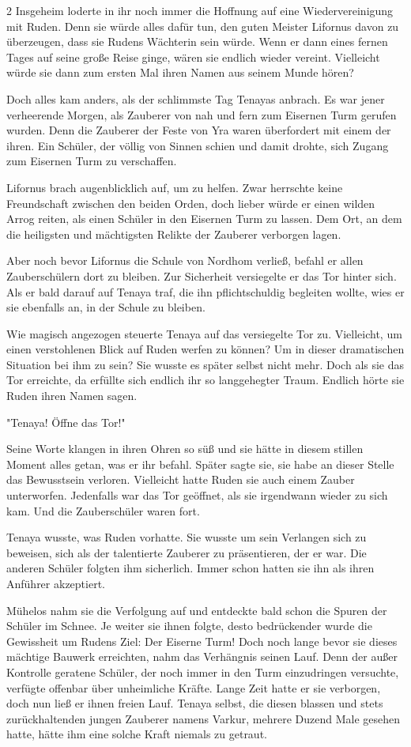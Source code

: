 \documentclass[10pt, a4paper, oneside]{book}
\begin{document}
\begin{multicols}{2}
Insgeheim loderte in ihr noch immer die Hoffnung auf eine Wiedervereinigung mit Ruden. Denn sie würde alles dafür tun, den guten Meister Lifornus davon zu überzeugen, dass sie Rudens Wächterin sein würde. Wenn er dann eines fernen Tages auf seine große Reise ginge, wären sie endlich wieder vereint. Vielleicht würde sie dann zum ersten Mal ihren Namen aus seinem Munde hören?

Doch alles kam anders, als der schlimmste Tag Tenayas anbrach. Es war jener verheerende Morgen, als Zauberer von nah und fern zum Eisernen Turm gerufen wurden. Denn die Zauberer der Feste von Yra waren überfordert mit einem der ihren. Ein Schüler, der völlig von Sinnen schien und damit drohte, sich Zugang zum Eisernen Turm zu verschaffen.

Lifornus brach augenblicklich auf, um zu helfen. Zwar herrschte keine Freundschaft zwischen den beiden Orden, doch lieber würde er einen wilden Arrog reiten, als einen Schüler in den Eisernen Turm zu lassen. Dem Ort, an dem die heiligsten und mächtigsten Relikte der Zauberer verborgen lagen.

Aber noch bevor Lifornus die Schule von Nordhom verließ, befahl er allen Zauberschülern dort zu bleiben. Zur Sicherheit versiegelte er das Tor hinter sich. Als er bald darauf auf Tenaya traf, die ihn pflichtschuldig begleiten wollte, wies er sie ebenfalls an, in der Schule zu bleiben.

Wie magisch angezogen steuerte Tenaya auf das versiegelte Tor zu. Vielleicht, um einen verstohlenen Blick auf Ruden werfen zu können? Um in dieser dramatischen Situation bei ihm zu sein? Sie wusste es später selbst nicht mehr. Doch als sie das Tor erreichte, da erfüllte sich endlich ihr so langgehegter Traum. Endlich hörte sie Ruden ihren Namen sagen.

"Tenaya! Öffne das Tor!"

Seine Worte klangen in ihren Ohren so süß und sie hätte in diesem stillen Moment alles getan, was er ihr befahl. Später sagte sie, sie habe an dieser Stelle das Bewusstsein verloren. Vielleicht hatte Ruden sie auch einem Zauber unterworfen. Jedenfalls war das Tor geöffnet, als sie irgendwann wieder zu sich kam. Und die Zauberschüler waren fort.

Tenaya wusste, was Ruden vorhatte. Sie wusste um sein Verlangen sich zu beweisen, sich als der talentierte Zauberer zu präsentieren, der er war. Die anderen Schüler folgten ihm sicherlich. Immer schon hatten sie ihn als ihren Anführer akzeptiert.

Mühelos nahm sie die Verfolgung auf und entdeckte bald schon die Spuren der Schüler im Schnee. Je weiter sie ihnen folgte, desto bedrückender wurde die Gewissheit um Rudens Ziel: Der Eiserne Turm! Doch noch lange bevor sie dieses mächtige Bauwerk erreichten, nahm das Verhängnis seinen Lauf. Denn der außer Kontrolle geratene Schüler, der noch immer in den Turm einzudringen versuchte, verfügte offenbar über unheimliche Kräfte. Lange Zeit hatte er sie verborgen, doch nun ließ er ihnen freien Lauf. Tenaya selbst, die diesen blassen und stets zurückhaltenden jungen Zauberer namens Varkur, mehrere Duzend Male gesehen hatte, hätte ihm eine solche Kraft niemals zu getraut.


\end{multicols}
\end{document}
